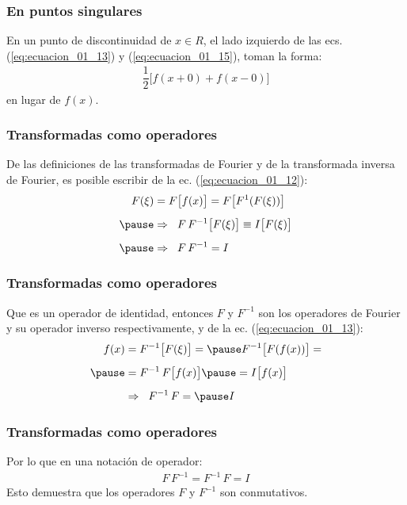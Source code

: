 \begin{frame}
\frametitle{En puntos singulares}
En un punto de discontinuidad de $x \in R$, el lado izquierdo de las ecs. (\ref{eq:ecuacion_01_13}) y (\ref{eq:ecuacion_01_15}), toman la forma:
\pause
\begin{align*}
\dfrac{1}{2} \big[ f(x + 0) + f(x - 0) \big]
\end{align*}
en lugar de $f (x)$.
\end{frame}
\begin{frame}
\frametitle{Transformadas como operadores}
De las definiciones de las transformadas de Fourier y de la transformada inversa de Fourier, es posible escribir de la ec. (\ref{eq:ecuacion_01_12}):
\pause
\begin{eqnarray*}
\begin{aligned}
F (\xi) &= F \big[ f (x) \big] = F \big[ F^{1} (F (\xi)) \big] \\[0.5em] \pause
&\Rightarrow \hspace{0.2cm} F \, F^{-1} \big[ F (\xi) \big] \equiv I \big[ F (\xi) \big] \\[0.5em] \pause
&\Rightarrow \hspace{0.2cm} F \, F^{-1} = I
\end{aligned}
\end{eqnarray*}
\end{frame}
\begin{frame}
\frametitle{Transformadas como operadores}
Que es un operador de identidad, entonces $F$ y $F^{-1}$ son los operadores de Fourier y su operador inverso respectivamente, y de la ec. (\ref{eq:ecuacion_01_13}):
\pause
\begin{eqnarray}
\begin{aligned}[b]
f (x) &= F^{-1} \big[ F (\xi) \big] = \pause F^{-1} \big[ F(f (x)) \big] = \\[0.5em] \pause 
&= F^{-1} \, F \big[ f (x) \big] \pause = I \big[ f (x) \big] \\[0.5em]
&\Rightarrow \hspace{0.2cm} F^{-1} \, F = \pause I
\end{aligned}
\label{eq:ecuacion_01_16}
\end{eqnarray}
\end{frame}
\begin{frame}
\frametitle{Transformadas como operadores}    
Por lo que en una notación de operador:
\pause
\begin{align*}
F \, F^{-1} = F^{-1} \, F = I
\end{align*}
\pause
Esto demuestra que los operadores $F$ y $F^{-1}$ son conmutativos.
\end{frame}


